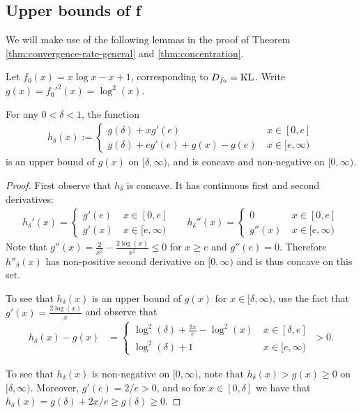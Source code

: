 



\subsection{Upper bounds of f}\label{appendix:subsubsec:f-upper-bounds}

We will make use of the following lemmas in the proof of Theorem \ref{thm:convergence-rate-general} and \ref{thm:concentration}.

\begin{lemma}\label{lemma:concave-upper-bound-kl} 
Let $f_0(x)=x\log x - x +1$, corresponding to $D_{f_0} = \mathrm{KL}$.
Write $g(x) = f_0'^2(x) = \log^2(x)$.

For any $0< \delta < 1$, the function
\begin{align*}
    h_{\delta}(x) := \begin{cases} 
    g(\delta) + x g'(e) & \: x \in [0, e]\\
    g(\delta) + e g'(e) + g(x) - g(e) & \: x \in [e, \infty)
    \end{cases}
\end{align*}
is an upper bound of $g(x)$ on $[\delta, \infty)$, and is concave and non-negative on $[0, \infty)$.
\end{lemma}

\begin{proof}

First observe that $h_{\delta}$ is concave.
It has continuous first and second derivatives:
\begin{align*}
    h_{\delta}'(x) = \begin{cases} 
    g'(e) & \: x \in [0, e]\\
    g'(x) & \: x \in [e, \infty)
    \end{cases}
    &&
    h_{\delta}''(x) = \begin{cases} 
    0 & \: x \in [0, e]\\
    g''(x) & \: x \in [e, \infty)
    \end{cases}
\end{align*}
Note that $g''(x) = \frac{2}{x^2} - \frac{2 \log(x)}{x^2} \leq 0$ for $x \geq e$ and $g''(e) = 0$.
Therefore $h''_{\delta}(x)$ has non-positive second derivative on $[0, \infty)$ and is thus concave on this set.

To see that $h_{\delta}(x)$ is an upper bound of $g(x)$ for $x \in [\delta, \infty)$, use the fact that $g'(x) = \frac{2\log(x)}{x}$ and observe that
\begin{align*}
    h_{\delta}(x) - g(x)
    &= \begin{cases} 
    \log^2(\delta) + \frac{2x}{e} - \log^2(x)& \: x \in [\delta, e]\\
    \log^2(\delta) + 1& \: x \in [e, \infty)
    \end{cases}
    \ > 0.
\end{align*}

To see that $h_{\delta}(x)$ is non-negative on $[0, \infty)$, note that $h_{\delta}(x) > g(x) \geq 0$ on $[\delta, \infty)$. 
Moreover, $g'(e) = 2/e > 0$, and so for $x \in [0, \delta]$ we have that $h_{\delta}(x) = g(\delta) + 2x/e \geq g(\delta) \geq 0$.
\end{proof}

